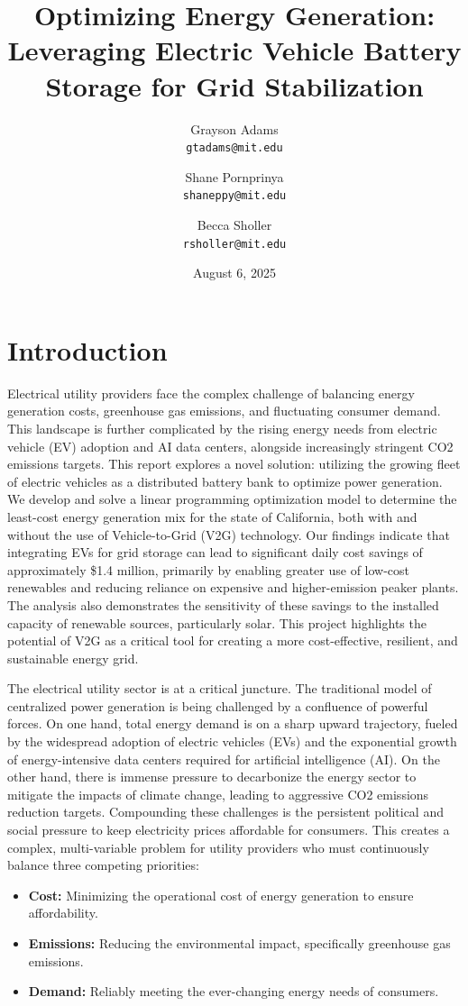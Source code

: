 \documentclass[12pt, letterpaper]{article}
\title{Optimizing Energy Generation: Leveraging Electric Vehicle Battery Storage for Grid Stabilization}
\author{Grayson Adams \\ \texttt{gtadams@mit.edu} \and
        Shane Pornprinya \\ \texttt{shaneppy@mit.edu} \and
        Becca Sholler \\ \texttt{rsholler@mit.edu}}
\date{August 6, 2025}
\begin{document}
\maketitle
\thispagestyle{empty}

\onehalfspacing
\tableofcontents

\newpage

\section{Introduction}
\noindent Electrical utility providers face the complex challenge of balancing energy generation costs, greenhouse gas emissions, and fluctuating consumer demand. This landscape is further complicated by the rising energy needs from electric vehicle (EV) adoption and AI data centers, alongside increasingly stringent CO2 emissions targets. This report explores a novel solution: utilizing the growing fleet of electric vehicles as a distributed battery bank to optimize power generation. We develop and solve a linear programming optimization model to determine the least-cost energy generation mix for the state of California, both with and without the use of Vehicle-to-Grid (V2G) technology. Our findings indicate that integrating EVs for grid storage can lead to significant daily cost savings of approximately \$1.4 million, primarily by enabling greater use of low-cost renewables and reducing reliance on expensive and higher-emission peaker plants. The analysis also demonstrates the sensitivity of these savings to the installed capacity of renewable sources, particularly solar. This project highlights the potential of V2G as a critical tool for creating a more cost-effective, resilient, and sustainable energy grid.

The electrical utility sector is at a critical juncture. The traditional model of centralized power generation is being challenged by a confluence of powerful forces. On one hand, total energy demand is on a sharp upward trajectory, fueled by the widespread adoption of electric vehicles (EVs) and the exponential growth of energy-intensive data centers required for artificial intelligence (AI). On the other hand, there is immense pressure to decarbonize the energy sector to mitigate the impacts of climate change, leading to aggressive CO2 emissions reduction targets. Compounding these challenges is the persistent political and social pressure to keep electricity prices affordable for consumers. This creates a complex, multi-variable problem for utility providers who must continuously balance three competing priorities:
\begin{itemize}
    \item \textbf{Cost:} Minimizing the operational cost of energy generation to ensure affordability.
    \item \textbf{Emissions:} Reducing the environmental impact, specifically greenhouse gas emissions.
    \item \textbf{Demand:} Reliably meeting the ever-changing energy needs of consumers.
\end{itemize}
\end{document}
